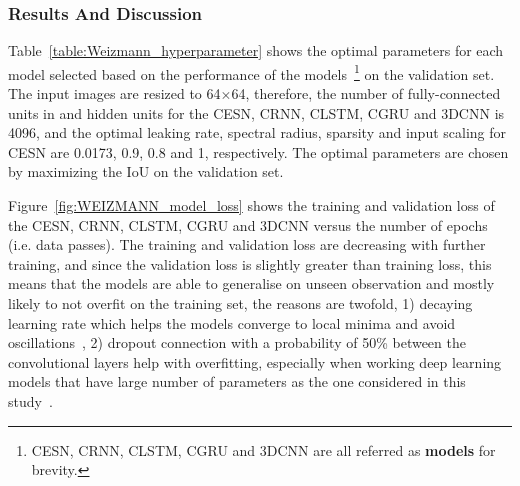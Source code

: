 \documentclass{WitsPhysicsReport}
\begin{document}
\subsubsection{Results And Discussion}

Table~\ref{table:Weizmann_hyperparameter} shows the optimal parameters for each model selected based on the performance of the models~\footnote{CESN, CRNN, CLSTM, CGRU and 3DCNN are all referred as \textbf{models} for brevity.} on the validation set. The input images are resized to 64$\times$64, therefore, the number of fully-connected units in and hidden units for the CESN, CRNN, CLSTM, CGRU and 3DCNN is 4096, and the optimal leaking rate, spectral radius, sparsity and input scaling for CESN are 0.0173, 0.9, 0.8 and 1, respectively. The optimal parameters are chosen by maximizing the IoU on the validation set.

\begin{table}[H]
    \centering
    \caption{WSD dataset optimal parameters for the CESN, CRNN, CLSTM, CGRU and 3DCNN}
    \label{table:Weizmann_hyperparameter}
\end{table}

Figure~\ref{fig:WEIZMANN_model_loss} shows the training and validation loss of the CESN, CRNN, CLSTM, CGRU and 3DCNN versus the number of epochs (i.e. data passes). The training and validation loss are decreasing with further training, and since the validation loss is slightly greater than training loss, this means that the models are able to generalise on unseen observation and mostly likely to not overfit on the training set, the reasons are twofold, 1) decaying learning rate which helps the models converge to local minima and avoid oscillations~\cite{you2019does}, 2) dropout connection with a probability of 50\% between the convolutional layers help with overfitting, especially when working deep learning models that have large number of parameters as the one considered in this study~\cite{hinton2012improving}.
\end{document}
